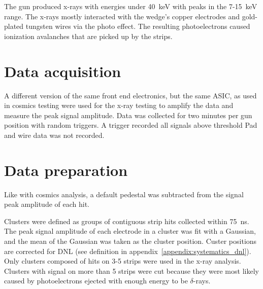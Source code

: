 The gun produced x-rays with energies under \SI{40}{\kilo\electronvolt} with peaks in the 7-\SI{15}{keV} range. The x-rays mostly interacted with the wedge's copper electrodes and gold-plated tungsten wires via the photo effect. The resulting photoelectrons caused ionization avalanches that are picked up by the strips.

\section{Data acquisition}

A different version of the same front end electronics, but the same ASIC, as used in cosmics testing were used for the x-ray testing to amplify the data and measure the peak signal amplitude. Data was collected for two minutes per gun position with random triggers. A trigger recorded all signals above threshold Pad and wire data was not recorded.

\section{Data preparation}

Like with cosmics analysis, a default pedestal was subtracted from the signal peak amplitude of each hit.

Clusters were defined as groups of contiguous strip hits collected within \SI{75}{ns}. The peak signal amplitude of each electrode in a cluster was fit with a Gaussian, and the mean of the Gaussian was taken as the cluster position. Custer positions are corrected for DNL (see definition in appendix~\ref{appendix:systematics_dnl}). Only clusters composed of hits on 3-5 strips were used in the x-ray analysis. Clusters with signal on more than 5 strips were cut because they were most likely caused by photoelectrons ejected with enough energy to  be $\delta$-rays.


